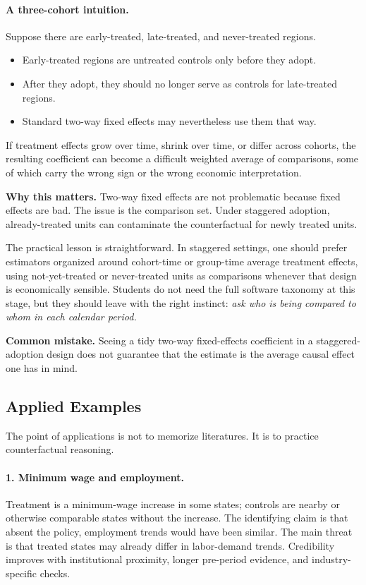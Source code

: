 \paragraph{A three-cohort intuition.}
Suppose there are early-treated, late-treated, and never-treated regions.
\begin{itemize}
\item Early-treated regions are untreated controls only before they adopt.
\item After they adopt, they should no longer serve as controls for late-treated regions.
\item Standard two-way fixed effects may nevertheless use them that way.
\end{itemize}
If treatment effects grow over time, shrink over time, or differ across cohorts, the resulting coefficient can become a difficult weighted average of comparisons, some of which carry the wrong sign or the wrong economic interpretation.

\begin{boxD}
\textbf{Why this matters.}
Two-way fixed effects are not problematic because fixed effects are bad. The issue is the comparison set. Under staggered adoption, already-treated units can contaminate the counterfactual for newly treated units.
\end{boxD}

The practical lesson is straightforward. In staggered settings, one should prefer estimators organized around cohort-time or group-time average treatment effects, using not-yet-treated or never-treated units as comparisons whenever that design is economically sensible. Students do not need the full software taxonomy at this stage, but they should leave with the right instinct: \emph{ask who is being compared to whom in each calendar period.}

\begin{boxF}
\textbf{Common mistake.}
Seeing a tidy two-way fixed-effects coefficient in a staggered-adoption design does not guarantee that the estimate is the average causal effect one has in mind.
\end{boxF}

\subsection{Applied Examples}
The point of applications is not to memorize literatures. It is to practice counterfactual reasoning.

\paragraph{1. Minimum wage and employment.}
Treatment is a minimum-wage increase in some states; controls are nearby or otherwise comparable states without the increase. The identifying claim is that absent the policy, employment trends would have been similar. The main threat is that treated states may already differ in labor-demand trends. Credibility improves with institutional proximity, longer pre-period evidence, and industry-specific checks.

